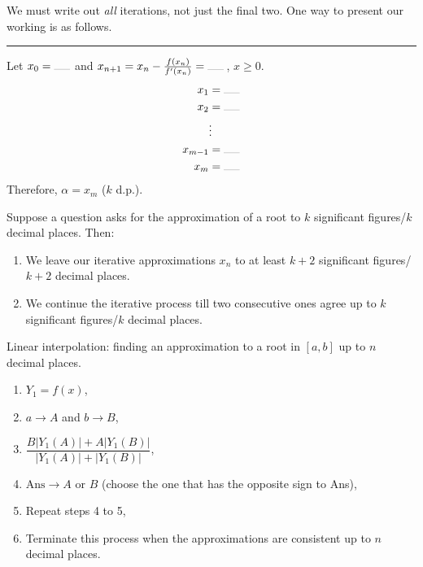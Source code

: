 \documentclass[../Notes.tex]{subfiles}
\begin{document}
\begin{note}
    We must write out \emph{all} iterations, not just the final two. One way to present our working is as follows.

    \rule{20cm-137.0549pt}{0.05mm}

    Let \(x_0=\rule{0.5cm}{0.05mm}\) and \(x_{n+1}=x_n-\frac{f(x_n)}{f'(x_n)}=\rule{0.5cm}{0.05mm}\)\,, \(x\geq 0\).
    \begin{align*}
        x_1&=\rule{0.5cm}{0.05mm}\\
        x_2&=\rule{0.5cm}{0.05mm}\\
        &\vdots\\
        x_{m-1}&=\rule{0.5cm}{0.05mm}\\
        x_m&=\rule{0.5cm}{0.05mm}
    \end{align*}
    Therefore, \(\alpha=x_m\) (\(k\) d.p.).
\end{note}
\begin{note}
    Suppose a question asks for the approximation of a root to \(k\) significant figures/\(k\) decimal places. Then: 
    \begin{enumerate}
        \item We leave our iterative approximations \(x_n\) to at least \(k+2\) significant figures/\(k+2\) decimal places.
        \item We continue the iterative process till two consecutive ones agree up to \(k\) significant figures/\(k\) decimal places.
    \end{enumerate}
\end{note}
\begin{GCSkills}{}
    Linear interpolation: finding an approximation to a root in \([a,b]\) up to \(n\) decimal places.
    \begin{enumerate}
        \item \(Y_1=f(x)\),
        \item \(a \to A\) and \(b \to B\),
        \item \(\dfrac{B \lvert Y_1(A) \rvert+A \lvert Y_1(B) \rvert}{\lvert Y_1(A) \rvert+\lvert Y_1(B) \rvert}\),
        \item \(\text{Ans}\to A \text{ or } B\) (choose the one that has the opposite sign to Ans),
        \item Repeat steps 4 to 5,
        \item Terminate this process when the approximations are consistent up to \(n\) decimal places.
    \end{enumerate}
    \end{GCSkills}
\end{document}
